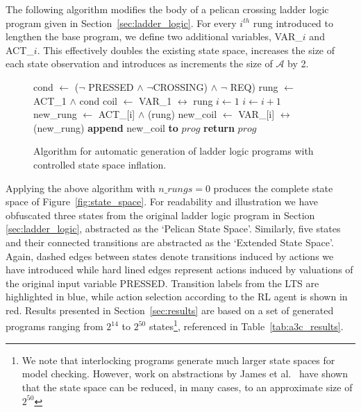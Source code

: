 \documentclass[runningheads]{llncs}
\begin{document}
The following algorithm modifies the body of a pelican crossing ladder logic program given in Section~\ref{sec:ladder_logic}. For every $i^{th}$ rung introduced to lengthen the base program, we define two additional variables, VAR\_$i$ and ACT\_$i$. This effectively doubles the existing state space, increases the size of each state observation and introduces as increments the size of $\mathcal{A}$ by 2.
\begin{figure}[!h]
	\begin{algorithmic}\label{algo:ladder_generation}
		\State cond $\gets$ ($\lnot$ PRESSED $\land$ $\lnot$CROSSING) $\land$ $\lnot$ REQ)
		\State rung $\gets$ ACT\_1 $\land$ cond
		\State coil $\gets$ VAR\_1 $\leftrightarrow$ rung
		\State $i \gets 1$ 
		\State $i \gets i+1$
		\State new\_rung $\gets$ ACT\_[i] $\land$ (rung)
		\State new\_coil $\gets$ VAR\_[i] $\leftrightarrow$ (new\_rung)
		\State \textbf{append} new\_coil \textbf{to} $prog$
		\EndWhile
		\State \textbf{return} $prog$
		\EndProcedure
	\end{algorithmic}
	\caption{Algorithm for automatic generation of ladder logic programs with controlled state space inflation.}
	\label{fig:algorithm}
\end{figure}

Applying the above algorithm with $n\_rungs=0$ produces the complete state space of Figure~\ref{fig:state_space}. For readability and illustration we have obfuscated three states from the original ladder logic program in Section \ref{sec:ladder_logic}, abstracted as the `Pelican State Space'. Similarly, five states and their connected transitions are abstracted as the `Extended State Space'.  Again, dashed edges between states denote transitions induced by actions we have introduced while hard lined edges represent actions induced by valuations of the original input variable PRESSED. Transition labels from the LTS are highlighted in blue, while action selection according to the RL agent is shown in red. Results presented in Section~\ref{sec:results} are based on a set of generated programs ranging from $2^{14}$ to $2^{50}$ states\footnote{We note that interlocking programs generate much larger state spaces for model checking. However, work on abstractions by James et al.~\cite{james2011automatically} have shown that the state space can be reduced, in many cases, to an approximate size of $2^{50}$}, referenced in Table~\ref{tab:a3c_results}.
\end{document}
